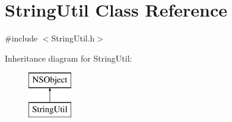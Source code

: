 \hypertarget{interface_string_util}{
\section{\-String\-Util \-Class \-Reference}
\label{interface_string_util}
}


{\ttfamily \#include $<$\-String\-Util.\-h$>$}

\-Inheritance diagram for \-String\-Util\-:\begin{figure}[H]
\begin{center}
\leavevmode
\includegraphics[height=2.000000cm]{interface_string_util}
\end{center}
\end{figure}
